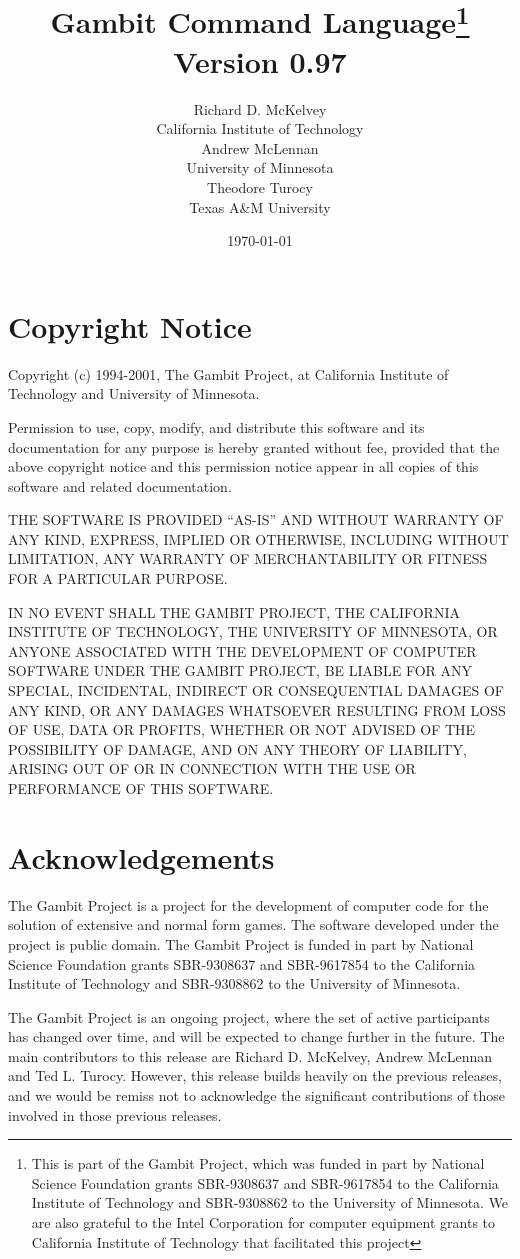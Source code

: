 \documentclass[12pt]{report}
\title{Gambit Command Language\thanks{This is part of
the Gambit Project, which was funded in part by National Science
Foundation grants SBR-9308637 and SBR-9617854 to the California
Institute of Technology and SBR-9308862 to the University of
Minnesota.  We are also grateful to the Intel Corporation for computer
equipment grants to California Institute of Technology that
facilitated this project}\\Version 0.97}
\author{Richard D. McKelvey \\
California Institute of Technology \\
\htmlignore{\and}
Andrew McLennan \\
University of Minnesota \\
\htmlignore{\and}
Theodore Turocy \\
Texas A\&M University}
\date{\today}
\begin{document}
\maketitle

\tableofcontents

\chapter*{Copyright Notice}

Copyright (c) 1994-2001, The Gambit Project, at California Institute of
Technology and University of Minnesota.

Permission to use, copy, modify, and distribute this software and its
documentation for any purpose is hereby granted without fee, provided
that the above copyright notice and this permission notice appear in
all copies of this software and related documentation.

THE SOFTWARE IS PROVIDED ``AS-IS'' AND WITHOUT WARRANTY OF ANY KIND,
EXPRESS, IMPLIED OR OTHERWISE, INCLUDING WITHOUT LIMITATION, ANY
WARRANTY OF MERCHANTABILITY OR FITNESS FOR A PARTICULAR PURPOSE.
 
IN NO EVENT SHALL THE GAMBIT PROJECT, THE CALIFORNIA INSTITUTE OF
TECHNOLOGY, THE UNIVERSITY OF MINNESOTA, OR ANYONE ASSOCIATED WITH THE
DEVELOPMENT OF COMPUTER SOFTWARE UNDER THE GAMBIT PROJECT, BE LIABLE
FOR ANY SPECIAL, INCIDENTAL, INDIRECT OR CONSEQUENTIAL DAMAGES OF ANY
KIND, OR ANY DAMAGES WHATSOEVER RESULTING FROM LOSS OF USE, DATA OR
PROFITS, WHETHER OR NOT ADVISED OF THE POSSIBILITY OF DAMAGE, AND ON
ANY THEORY OF LIABILITY, ARISING OUT OF OR IN CONNECTION WITH THE USE
OR PERFORMANCE OF THIS SOFTWARE.

\chapter*{Acknowledgements}

The Gambit Project is a project for the development of computer code
for the solution of extensive and normal form games.  The software
developed under the project is public domain. The Gambit Project is
funded in part by National Science Foundation grants SBR-9308637 and
SBR-9617854 to the California Institute of Technology and SBR-9308862
to the University of Minnesota.

The Gambit Project is an ongoing project, where the set of active
participants has changed over time, and will be expected to change
further in the future.  The main contributors to this release are
Richard D. McKelvey, Andrew McLennan and Ted L. Turocy.  However, this
release builds heavily on the previous releases, and we would be
remiss not to acknowledge the significant contributions of those
involved in those previous releases.
\end{document}
